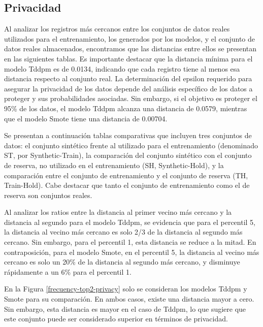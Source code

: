 \subsection{Privacidad}
\label{privacidad-kingcounty}
Al analizar los registros más cercanos entre los conjuntos de datos reales utilizados para el entrenamiento, los generados por los modelos, y el conjunto de datos reales almacenados, encontramos que las distancias entre ellos se presentan en las siguientes tablas. Es importante destacar que la distancia mínima para el modelo Tddpm es de 0.0134, indicando que cada registro tiene al menos esa distancia respecto al conjunto real. La determinación del epsilon requerido para asegurar la privacidad de los datos depende del análisis específico de los datos a proteger y sus probabilidades asociadas. Sin embargo, si el objetivo es proteger el 95\% de los datos, el modelo Tddpm alcanza una distancia de 0.0579, mientras que el modelo Smote tiene una distancia de 0.00704.

Se presentan a continuación tablas comparativas que incluyen tres conjuntos de datos: el conjunto sintético frente al utilizado para el entrenamiento (denominado ST, por Synthetic-Train), la comparación del conjunto sintético con el conjunto de reserva, no utilizado en el entrenamiento (SH, Synthetic-Hold), y la comparación entre el conjunto de entrenamiento y el conjunto de reserva (TH, Train-Hold). Cabe destacar que tanto el conjunto de entrenamiento como el de reserva son conjuntos reales.




\newpage
Al analizar los ratios entre la distancia al primer vecino más cercano y la distancia al segundo para el modelo Tddpm, se evidencia que para el percentil 5, la distancia al vecino más cercano es solo 2/3 de la distancia al segundo más cercano. Sin embargo, para el percentil 1, esta distancia se reduce a la mitad. En contraposición, para el modelo Smote, en el percentil 5, la distancia al vecino más cercano es solo un 20\% de la distancia al segundo más cercano, y disminuye rápidamente a un 6\% para el percentil 1.





\newpage
En la Figura \ref{frecuency-top2-privacy} solo se consideran los modelos Tddpm y Smote para su comparación. En ambos casos, existe una distancia mayor a cero. Sin embargo, esta distancia es mayor en el caso de Tddpm, lo que sugiere que este conjunto puede ser considerado superior en términos de privacidad.


